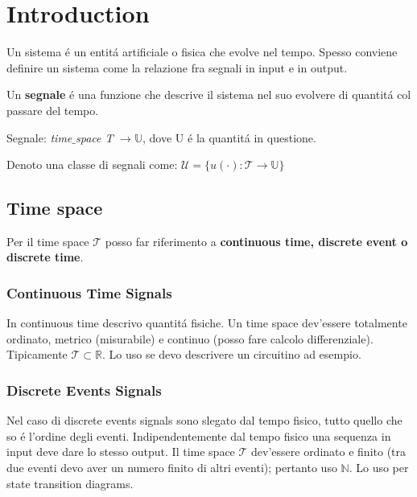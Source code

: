 \chapter{Introduction}
\begin{tcolorbox}\begin{center}
Un sistema \'e un entit\'a artificiale o fisica che evolve nel tempo. Spesso conviene definire un sistema come la relazione fra segnali in input e in output.
\end{center}\end{tcolorbox}
Un \textbf{segnale} \'e una funzione che descrive il sistema nel suo evolvere di quantit\'a col passare del tempo. 

\begin{tcolorbox}\begin{center}
    Segnale: \textit{time$\_$space T} $\rightarrow \mathbb{U}$, dove U \'e la quantit\'a in questione. \\
\end{center}\end{tcolorbox}

Denoto una classe di segnali come:
$\mathcal{U}=\{u(\cdot):\mathcal{T} \rightarrow \mathbb{U}\}$

\section{Time space}
Per il time space $\mathcal{T}$ posso far riferimento a \textbf{continuous time, discrete event o discrete time}.

\subsection{Continuous Time Signals}
In continuous time descrivo quantit\'a fisiche. Un time space dev'essere totalmente ordinato, metrico (misurabile) e continuo (posso fare calcolo differenziale).
Tipicamente $\mathcal{T} \subset \mathbb{R}$. Lo uso se devo descrivere un circuitino ad esempio.

\subsection{Discrete Events Signals}
Nel caso di discrete events signals sono slegato dal tempo fisico, tutto quello che so \'e l'ordine degli eventi. 
Indipendentemente dal tempo fisico una sequenza in input deve dare lo stesso output. Il time space $\mathcal{T}$ dev'essere
ordinato e finito (tra due eventi devo aver un numero finito di altri eventi); pertanto uso $\mathbb{N}$. Lo uso per state transition diagrams.


